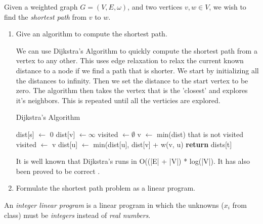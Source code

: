 \documentclass{article}
\begin{document}
\nextprob
Given a weighted graph $G=(V,E,\omega)$, and two vertices $v,w \in V$, we wish
to find the \emph{shortest path} from $v$ to $w$.

\begin{enumerate}
\item Give an algorithm to compute the shortest path.

We can use Dijkstra's Algorithm to quickly compute the shortest path from a vertex to any other.
This uses edge relaxation to relax the current known distance to a node if we find a path that is shorter.
We start by initializing all the distances to infinity. Then we set the distance to the start vertex to be zero.
The algorithm then takes the vertex that is the 'closest' and explores it's neighbors.
This is repeated until all the verticies are explored.

\begin{algorithm}
\caption{Dijkstra's Algorithm}\label{guests}
\begin{algorithmic}[1]
\State dist[s] $\gets$ 0
\State dist[v] $\gets \infty$
\EndFor
\State visited $\gets \emptyset$
\State v $\gets$ min(dist) that is not visited
\State visited $\gets$ v
\State dist[u] $\gets$ min(dist[u], dist[v] + w(v, u)
\EndFor
\EndWhile
\State \textbf{return} dists[t]
\EndFunction
\end{algorithmic}
\end{algorithm}

It is well known that Dijkstra's runs in O((|E| + |V|) * log(|V|). It has also been proved to be correct \cite{Dijkstra}.

\item Formulate the shortest path problem as a linear program.
\end{enumerate}





\nextprob
An \emph{integer linear program} is a linear program in which the unknowns
($x_i$ from class) must be \emph{integers} instead of \emph{real numbers}.
\end{document}
